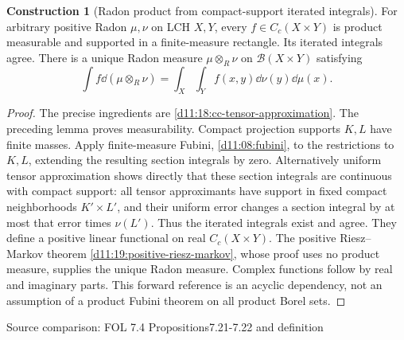 \documentclass[11pt,oneside,openany]{book}
\theoremstyle{definition}
\newtheorem{construction}[theorem]{Construction}
\theoremstyle{remark}
\newcommand{\BB}{\mathcal B}\newcommand{\SSS}{\mathcal S}
\newcommand{\family}[1]{}
\newcommand{\source}[1]{\par\begingroup\small\sffamily\color{black!65}Source comparison: #1\par\endgroup}
\begin{document}
\begin{construction}[Radon product from compact-support iterated integrals]\family{D11.18.radon_product}\label{d11:18:radon-product}
For arbitrary positive Radon $\mu,\nu$ on LCH $X,Y$, every $f\in C_c(X\times Y)$ is product measurable and supported in a finite-measure rectangle. Its iterated integrals agree. There is a unique Radon measure $\mu\otimes_R\nu$ on $\BB(X\times Y)$ satisfying
\[\int f\dd(\mu\otimes_R\nu)=\int_X\int_Y f(x,y)\dd\nu(y)\dd\mu(x).\]
\end{construction}
\begin{proof}
The precise ingredients are \cref{d11:18:cc-tensor-approximation}. The preceding lemma proves measurability. Compact projection supports $K,L$ have finite masses. Apply finite-measure Fubini, \cref{d11:08:fubini}, to the restrictions to $K,L$, extending the resulting section integrals by zero. Alternatively uniform tensor approximation shows directly that these section integrals are continuous with compact support: all tensor approximants have support in fixed compact neighborhoods $K'\times L'$, and their uniform error changes a section integral by at most that error times $\nu(L')$. Thus the iterated integrals exist and agree. They define a positive linear functional on real $C_c(X\times Y)$. The positive Riesz--Markov theorem \cref{d11:19:positive-riesz-markov}, whose proof uses no product measure, supplies the unique Radon measure. Complex functions follow by real and imaginary parts. This forward reference is an acyclic dependency, not an assumption of a product Fubini theorem on all product Borel sets.
\end{proof}
\source{FOL 7.4 Propositions7.21-7.22 and definition}
\end{document}
